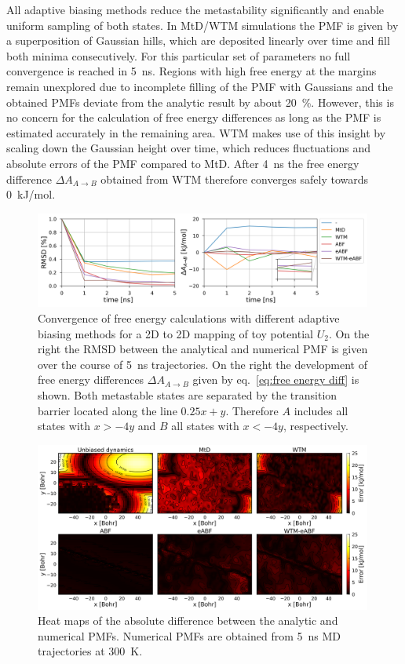 All adaptive biasing methods reduce the metastability significantly and enable uniform sampling of both states.
In MtD/WTM simulations the PMF is given by a superposition of Gaussian hills, which are deposited linearly over time and fill both minima consecutively.
For this particular set of parameters no full convergence is reached in 5~ns.
Regions with high free energy at the margins remain unexplored due to incomplete filling of the PMF with Gaussians and the obtained PMFs deviate from the analytic result by about 20~\%.
However, this is no concern for the calculation of free energy differences as long as the PMF is estimated accurately in the remaining area.
WTM makes use of this insight by scaling down the Gaussian height over time, which reduces fluctuations and absolute errors of the PMF compared to MtD.
After 4~ns the free energy difference $\Delta A_{A\to B}$ obtained from WTM therefore converges safely towards 0~kJ/mol.
\begin{figure}[H]
   \centering
   \includegraphics[width=0.99\textwidth]{bilder/test_2D/conv}
   \caption{Convergence of free energy calculations with different adaptive biasing methods for a 2D to 2D mapping of toy potential $U_2$. On the right the RMSD between the analytical and numerical PMF is given over the course of 5~ns trajectories. On the right the development of free energy differences $\Delta A_{A\to B}$ given by eq.~\ref{eq:free energy diff} is shown. Both metastable states are separated by the transition barrier located along the line $0.25x+y$. Therefore $A$ includes all states with $x>-4y$ and $B$ all states with $x<-4y$, respectively.}
 \label{fig:conv 2D}%
\end{figure}
\begin{figure}[H]
  \centering
  \includegraphics[width=0.99\textwidth]{bilder/test_2D/error_5ns}
  \caption{Heat maps of the absolute difference between the analytic and numerical PMFs. Numerical PMFs are obtained from 5~ns MD trajectories at 300~K.}
\label{fig:error 2D}%
\end{figure}
